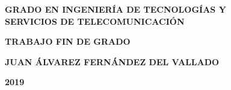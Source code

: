 \pagestyle{empty}

\vspace*{5.5cm}

\begin{center}

{\Large\rm \textbf{ GRADO EN INGENIERÍA DE TECNOLOGÍAS Y\\
SERVICIOS DE TELECOMUNICACIÓN\\}}

\vspace{1.0cm}

{\Large\rm \textbf{TRABAJO FIN DE GRADO}}

\vspace{2cm}

{\Large\rm\textbf{\tfgtitle}}

\vspace*{\fill}

{\Large\rm\textbf{JUAN ÁLVAREZ FERNÁNDEZ DEL VALLADO}}

{\Large \textbf{2019}}
\vspace{1.0cm}
\end{center}

